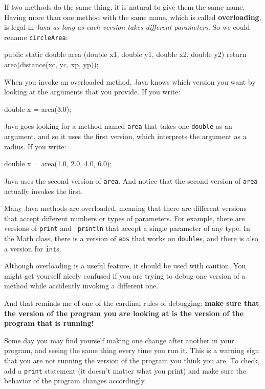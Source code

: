 \documentclass{book}
\begin{document}
If two methods do the same thing, it is natural to give them
the same name.  
Having more than one method with the same name, which is called {\bf
overloading}, is legal in Java {\em as long as each version takes
different parameters}.  So we could rename {\tt circleArea}:

\begin{verbatimtab}
  public static double area
              (double x1, double y1, double x2, double y2) {
    return area(distance(xc, yc, xp, yp));
  } 
\end{verbatimtab}
%
When you invoke an overloaded method, Java knows which version you
want by looking at the arguments that you provide.  If you write:

\begin{verbatimtab}
    double x = area(3.0);
\end{verbatimtab}
%
Java goes looking for a method named {\tt area} that
takes one {\tt double} as an argument, and so it uses the
first version, which interprets the argument as a radius.
If you write:

\begin{verbatimtab}
    double x = area(1.0, 2.0, 4.0, 6.0);
\end{verbatimtab}
%
Java uses the second version of {\tt area}.  And notice that the
second version of {\tt area} actually invokes the first.

Many Java methods are overloaded, meaning that there
are different versions that accept different numbers or types of
parameters.  For example, there are versions of {\tt print} and {\tt
println} that accept a single parameter of any type.  In the Math
class, there is a version of {\tt abs} that works on {\tt double}s,
and there is also a version for {\tt int}s.

Although overloading is a useful feature, it should be used
with caution.  You might get yourself nicely confused if you
are trying to debug one version of a method while accidently
invoking a different one.

And that reminds me of one of the cardinal rules of
debugging: {\bf make sure that the version of the program
you are looking at is the version of the program that is running!}

Some day you may find yourself making one change after another
in your program, and seeing the same thing every time you run it.
This is a warning sign that you are
not running the version of the program you think you are.  To
check, add a {\tt print} statement (it doesn't matter what
you print) and make sure the behavior of the program changes
accordingly.
\end{document}
